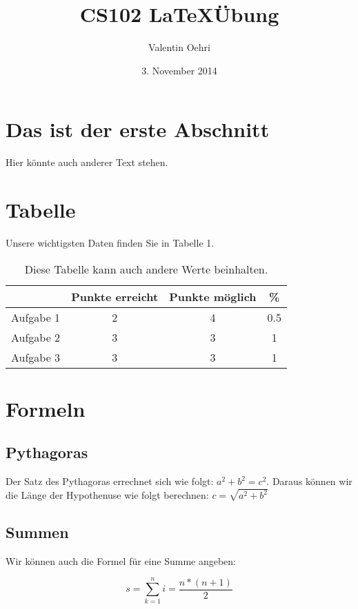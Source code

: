 \documentclass[11pt]{article}
\date{3. November 2014}
\author{Valentin Oehri}
\title{CS102 \LaTeX \"Ubung}
\begin{document}
\maketitle
\section{Das ist der erste Abschnitt}
Hier k\"onnte auch anderer Text stehen.
\section{Tabelle}
Unsere wichtigsten Daten finden Sie in Tabelle 1.
\begin{table} [htbp]
\centering
\begin{tabular}{c|c|c|c}
  & Punkte erreicht & Punkte m\"oglich & \% \\
\hline
Aufgabe 1 & 2 & 4 & 0.5 \\
Aufgabe 2 & 3 & 3 & 1 \\
Aufgabe 3 & 3 & 3 & 1 \\
\end{tabular}
\caption{Diese Tabelle kann auch andere Werte beinhalten.}
\end{table}

\section{Formeln}
\subsection{Pythagoras}
Der Satz des Pythagoras errechnet sich wie folgt: $a^2+b^2=c^2$. Daraus k\"onnen wir die L\"ange der Hypothenuse wie folgt berechnen: $c=\sqrt{a^2+b^2}$
\subsection{Summen}
Wir k\"onnen auch die Formel f\"ur eine Summe angeben:

\begin{equation}
s = \sum_{k=1}^ni=\frac{n*(n+1)}{2}
\end{equation}
\end{document}
